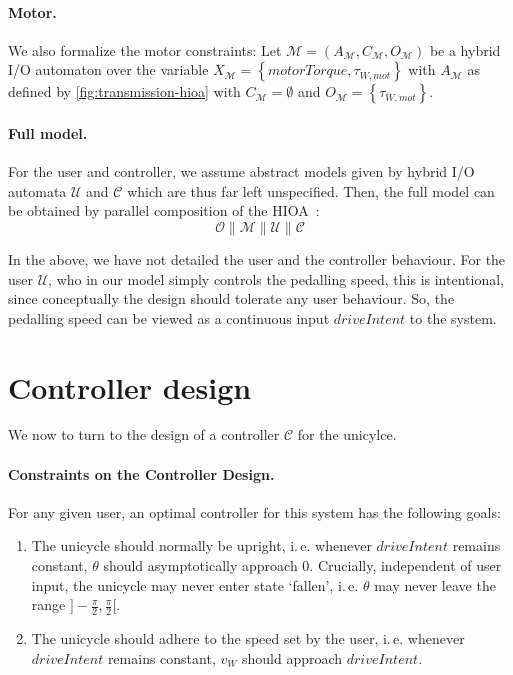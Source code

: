 \documentclass[copyright,submission]{eptcs}
\newcommand{\mi}[1]{\mathit{#1}}
\newcommand{\curly}[1]{\left\lbrace#1\right\rbrace}
\newcommand{\set}[1]{\curly{#1}}
\begin{document}
\paragraph{Motor.}
We also formalize the motor constraints: Let $\mathcal{M} = (A_\mathcal{M}, C_\mathcal{M}, O_\mathcal{M})$ be a hybrid I/O automaton over the variable $X_\mathcal{M} = \set{\mi{motorTorque}, \tau_{W, \mi{mot}}}$ with $A_\mathcal{M}$ as defined by \cref{fig:transmission-hioa} with $C_\mathcal{M} = \emptyset$ and $O_\mathcal{M} = \set{\tau_{W, \mi{mot}}}$.

\paragraph{Full model.}
For the user and controller, we assume abstract models given by hybrid I/O automata $\mathcal{U}$ and $\mathcal{C}$ which are thus far left unspecified. Then, the full model can be obtained by parallel composition of the HIOA~\cite{DonzeF13,DBLP:journals/tcs/AlurCHHHNOSY95}:
\[\mathcal{O} \parallel \mathcal{M} \parallel \mathcal{U} \parallel \mathcal{C}\]

In the above, we have not detailed the user and the controller
behaviour. For the user $\mathcal{U}$, who in our model simply
controls the pedalling speed, this is intentional, since conceptually
the design should tolerate any user behaviour. So, the pedalling speed
can be viewed as a continuous input $\mi{driveIntent}$ to the system.


\section{Controller design}\label{sect:controller-design}

We now to turn to the design of a controller $\mathcal{C}$ for the
unicylce.

\paragraph{Constraints on the Controller Design.}
 For any given user, an optimal controller for this system
has the following goals:

\begin{enumerate}
\item
    The unicycle should normally be upright, i.\,e. whenever $\mi{driveIntent}$ remains constant, $\theta$ should asymptotically approach $0$.
    Crucially, independent of user input, the unicycle may never enter state `fallen', i.\,e. $\theta$ may never leave the range $]-\frac{\pi}{2}, \frac{\pi}{2}[$.

\item
    The unicycle should adhere to the speed set by the user, i.\,e. whenever $\mi{driveIntent}$ remains constant, $v_W$ should approach $\mi{driveIntent}$.
\end{enumerate}
\end{document}
